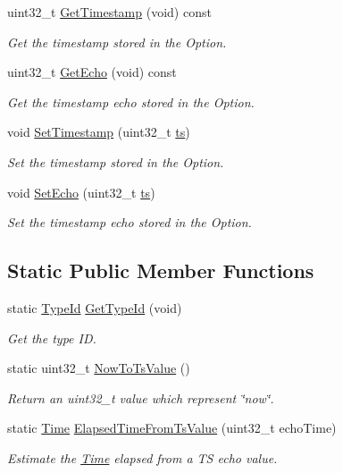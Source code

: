 \begin{DoxyCompactItemize}
uint32\+\_\+t \hyperlink{classns3_1_1TcpOptionTS_a96298c3d347dba059cf671c4f33b6ee8}{Get\+Timestamp} (void) const 
\begin{DoxyCompactList}\small\item\em Get the timestamp stored in the Option. \end{DoxyCompactList}\item 
uint32\+\_\+t \hyperlink{classns3_1_1TcpOptionTS_ac89342e97b8f226a78ac57ebd461901b}{Get\+Echo} (void) const 
\begin{DoxyCompactList}\small\item\em Get the timestamp echo stored in the Option. \end{DoxyCompactList}\item 
void \hyperlink{classns3_1_1TcpOptionTS_a1419aa24133aa3422269a817a3dd62db}{Set\+Timestamp} (uint32\+\_\+t \hyperlink{mmwave_2model_2fading-traces_2fading__trace__generator_8m_ada841f58d7be618bfbc76c87e7d44086}{ts})
\begin{DoxyCompactList}\small\item\em Set the timestamp stored in the Option. \end{DoxyCompactList}\item 
void \hyperlink{classns3_1_1TcpOptionTS_ae64ff1487e5bf1b579ae2f6cff3dadd4}{Set\+Echo} (uint32\+\_\+t \hyperlink{mmwave_2model_2fading-traces_2fading__trace__generator_8m_ada841f58d7be618bfbc76c87e7d44086}{ts})
\begin{DoxyCompactList}\small\item\em Set the timestamp echo stored in the Option. \end{DoxyCompactList}\end{DoxyCompactItemize}
\subsection*{Static Public Member Functions}
\begin{DoxyCompactItemize}
\item 
static \hyperlink{classns3_1_1TypeId}{Type\+Id} \hyperlink{classns3_1_1TcpOptionTS_a54ce1501eb71df2e7a1b173b5449b923}{Get\+Type\+Id} (void)
\begin{DoxyCompactList}\small\item\em Get the type ID. \end{DoxyCompactList}\item 
static uint32\+\_\+t \hyperlink{classns3_1_1TcpOptionTS_aa4a0e1a584d5cd3be873173cb686e069}{Now\+To\+Ts\+Value} ()
\begin{DoxyCompactList}\small\item\em Return an uint32\+\_\+t value which represent \char`\"{}now\char`\"{}. \end{DoxyCompactList}\item 
static \hyperlink{classns3_1_1Time}{Time} \hyperlink{classns3_1_1TcpOptionTS_a43934610282898ab9631acb58f2bd35e}{Elapsed\+Time\+From\+Ts\+Value} (uint32\+\_\+t echo\+Time)
\begin{DoxyCompactList}\small\item\em Estimate the \hyperlink{classns3_1_1Time}{Time} elapsed from a TS echo value. \end{DoxyCompactList}\end{DoxyCompactItemize}
